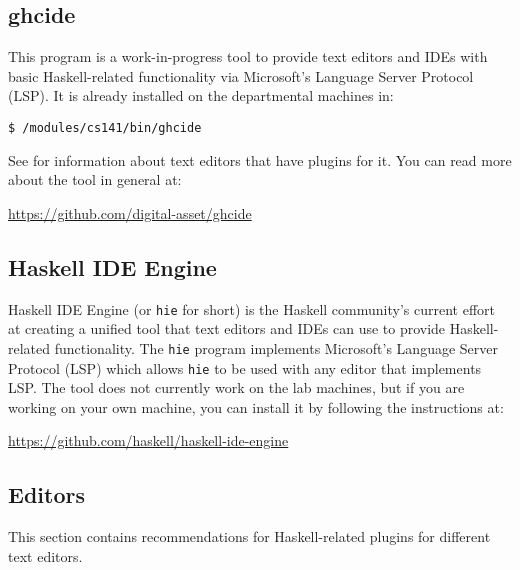 \subsection{ghcide}

This program is a work-in-progress tool to provide text editors and IDEs with basic Haskell-related functionality via Microsoft's Language Server Protocol (LSP). It is already installed on the departmental machines in:
\begin{verbatim}
$ /modules/cs141/bin/ghcide
\end{verbatim}
See  for information about text editors that have plugins for it. You can read more about the tool in general at:
\begin{center}\small
	\url{https://github.com/digital-asset/ghcide}
\end{center}

\subsection{Haskell IDE Engine}

Haskell IDE Engine (or \texttt{\small hie} for short) is the Haskell community's current effort at creating a unified tool that text editors and IDEs can use to provide Haskell-related functionality. The \texttt{\small hie} program implements Microsoft's Language Server Protocol (LSP) which allows \texttt{\small hie} to be used with any editor that implements LSP. The tool does not currently work on the lab machines, but if you are working on your own machine, you can install it by following the instructions at:
\begin{center}\small
	\url{https://github.com/haskell/haskell-ide-engine}
\end{center}

\subsection{Editors}
\label{sec:editors}

This section contains recommendations for Haskell-related plugins for different text editors.

